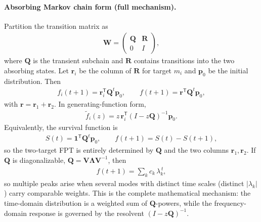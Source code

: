 \documentclass[11pt]{article}
\begin{document}
\paragraph{Absorbing Markov chain form (full mechanism).}
Partition the transition matrix as
\begin{align}
\mathbf{W}=\begin{pmatrix}\mathbf{Q} & \mathbf{R}\\ 0 & I\end{pmatrix},
\end{align}
where $\mathbf{Q}$ is the transient subchain and $\mathbf{R}$ contains transitions into the two absorbing states.
Let $\mathbf{r}_i$ be the column of $\mathbf{R}$ for target $m_i$ and $\mathbf{p}_0$ be the initial distribution. Then
\begin{align}
  f_i(t+1)=\mathbf{r}_i^{\mathsf T}\mathbf{Q}^{t}\mathbf{p}_0,\qquad
  f(t+1)=\mathbf{r}^{\mathsf T}\mathbf{Q}^{t}\mathbf{p}_0,
\end{align}
with $\mathbf{r}=\mathbf{r}_1+\mathbf{r}_2$.
In generating-function form,
\begin{align}
  \widetilde f_i(z)=z\,\mathbf{r}_i^{\mathsf T}(I-z\mathbf{Q})^{-1}\mathbf{p}_0.
\end{align}
Equivalently, the survival function is
\begin{align}
  S(t)=\mathbf{1}^{\mathsf T}\mathbf{Q}^{t}\mathbf{p}_0,\qquad f(t+1)=S(t)-S(t+1),
\end{align}
so the two-target FPT is entirely determined by $\mathbf{Q}$ and the two columns $\mathbf{r}_1,\mathbf{r}_2$.
If $\mathbf{Q}$ is diagonalizable, $\mathbf{Q}=\mathbf{V}\mathbf{\Lambda}\mathbf{V}^{-1}$,
then
\begin{align}
  f(t+1)=\sum_k c_k\,\lambda_k^{\,t},
\end{align}
so multiple peaks arise when several modes with distinct time scales (distinct $|\lambda_k|$) carry comparable weights.
This is the complete mathematical mechanism: the time-domain distribution is a weighted sum of $\mathbf{Q}$-powers,
while the frequency-domain response is governed by the resolvent $(I-z\mathbf{Q})^{-1}$.
\end{document}
